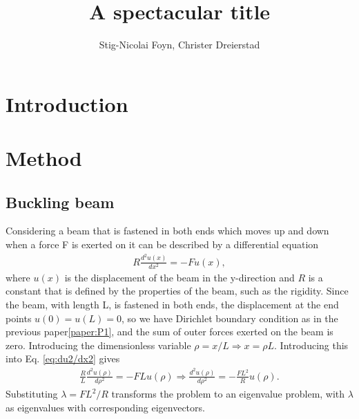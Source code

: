 \documentclass{emulateapj}
\begin{document}
\title{A spectacular title}

\author{Stig-Nicolai Foyn, Christer Dreierstad}




\begin{abstract}
\end{abstract}

\section{Introduction}
\label{sec:introduction}



\section{Method}
\label{sec:method}
\subsection{Buckling beam}
Considering a beam that is fastened in both ends which moves up and down when a force F is exerted on it can be described by a differential equation
%
\begin{gather}\label{eq:du2/dx2}
    R \frac{d^2 u(x)}{dx^2} = -Fu(x),
\end{gather}
%
where $u(x)$ is the displacement of the beam in the y-direction and $R$ is a constant that is defined by the properties of the beam, such as the rigidity. Since the beam, with length L, is fastened in both ends, the displacement at the end points $u(0) = u(L) = 0$, so we have Dirichlet boundary condition as in the previous paper\ref{paper:P1}, and the sum of outer forces exerted on the beam is zero. Introducing the dimensionless variable $\rho = x/L \Rightarrow x = \rho L$. Introducing this into Eq. \eqref{eq:du2/dx2} gives
%
\begin{gather*}
    \frac{R}{L}\frac{d^2 u(\rho)}{d\rho^2} = - FLu(\rho)
    \Rightarrow \frac{d^2 u(\rho)}{d\rho^2} = -\frac{FL^2}{R}u(\rho).
\end{gather*}
%
Substituting $\lambda = FL^2/R$ transforms the problem to an eigenvalue problem, with $\lambda$ as eigenvalues with corresponding eigenvectors. 
\end{document}

